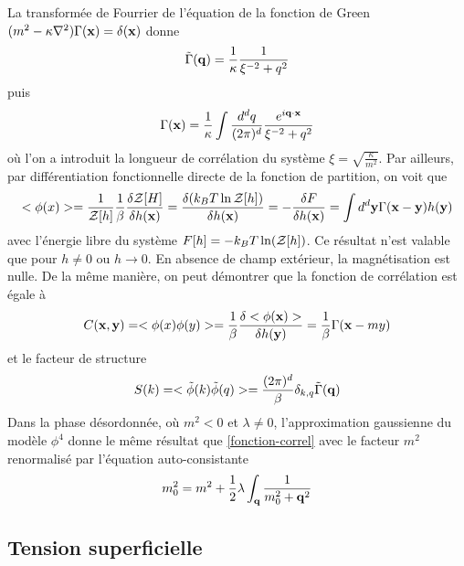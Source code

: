 La transformée de Fourrier de l'équation de la fonction de Green $(m^2-\kappa \nabla^2) \Gamma({\bf x}) = \delta({\bf x})$ donne
\begin{align}
    \tilde{\Gamma}({\bf q}) = \frac{1}{\kappa} \frac{1}{\xi^{-2} +  q^2}
\end{align}
puis
\begin{align}
    \Gamma({\bf x}) = \frac{1}{\kappa} \int \frac{d^dq}{(2\pi)^d} \frac{e^{i {\bf q} \cdot {\bf x}}}{\xi^{-2} +  q^2}
    \label{fonction-correl}
\end{align}
où l'on a introduit la longueur de corrélation du système $\xi = \sqrt{\frac{\kappa}{m^2}}$.
Par ailleurs, par différentiation fonctionnelle directe de la fonction de partition, on voit que
\begin{align}
    <\phi(x)> = \frac{1}{\mathcal{Z}[h]} \frac{1}{\beta} \frac{\delta \mathcal{Z}[H]}{\delta h({\bf x})} = \frac{\delta (k_B T \ln \mathcal{Z}[h])}{\delta h({\bf x})} = - \frac{\delta F}{\delta h({\bf x})} = \int d^d {\bf y} \Gamma({\bf x}-{\bf y}) h({\bf y})
\end{align} 
avec l'énergie libre du système  $F[h] = -k_B T \ln(\mathcal{Z}[h])$. Ce résultat n'est valable que pour $h \neq 0$ ou $h \to 0$. En absence de champ extérieur, la magnétisation est nulle.
De la même manière, on peut démontrer que la fonction de corrélation est égale à 
\begin{align}
    C({\bf x},{\bf y}) =  <\phi(x)\phi(y)> = \frac{1}{\beta} \frac{\delta <\phi({\bf x})>}{\delta h({\bf y})} = \frac{1}{\beta} \Gamma({\bf x}-my)
\end{align}
et le facteur de structure
\begin{align}
    S(k) = < \tilde{\phi}(k)\tilde{\phi}(q)> = \frac{(2\pi)^d}{\beta} \delta_{k,q}  \tilde{\Gamma}({\bf q})
\end{align}
Dans la phase désordonnée, où $m^2 \less 0$ et $\lambda \neq 0$, l'approximation gaussienne du modèle $\phi^4$ donne le même résultat que \ref{fonction-correl} avec le facteur $m^2$ renormalisé par l'équation auto-consistante \cite[\P 4.3]{bellac_equilibrium_2004}
\begin{align}
    m^2_0 = m^2 + \frac{1}{2} \lambda \int_{\bf q} \frac{1}{m^2_0+{\bf q}^2}
\end{align}
    \subsection{Tension superficielle}

